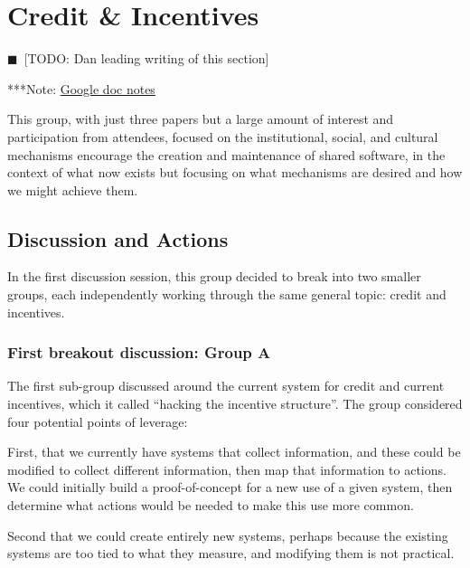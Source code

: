 \documentclass[11pt, oneside]{amsart}
\newcommand{\todo}[1]{{\color{blue}$\blacksquare$~\textsf{[TODO: #1]}}}
\newcommand{\note}[1]{ {\textcolor{blueish}    { ***Note:      #1 }}}
\begin{document}
\section{Credit \& Incentives} \label{sec:credit}
\todo{Dan leading writing of this section}

\note{\href{http://tinyurl.com/k8ruyn9}{Google doc notes}}

This group, with just three papers but a large amount of interest and participation from attendees,
focused on the institutional, social, and cultural mechanisms encourage the creation
and maintenance of shared software, in the context of what now exists but focusing
on what mechanisms are desired and how we might achieve them.


\subsection{Discussion and Actions}

In the first discussion session, this group decided to break into two smaller groups,
each independently working through the same general topic: credit and incentives.

\subsubsection{First breakout discussion: Group A}
The first sub-group discussed around the current system for credit and current incentives,
which it called ``hacking the incentive structure''.  The group considered four potential
points of leverage:

First, that we currently have systems that collect information, and these could be modified
to collect different information, then map that information to actions. We could
initially build a proof-of-concept for a new use of a given system, then determine
what actions would be needed to make this use more common.

Second that we could create entirely new systems, perhaps because the existing
systems are too tied to what they measure, and modifying them is not practical.
\end{document}
